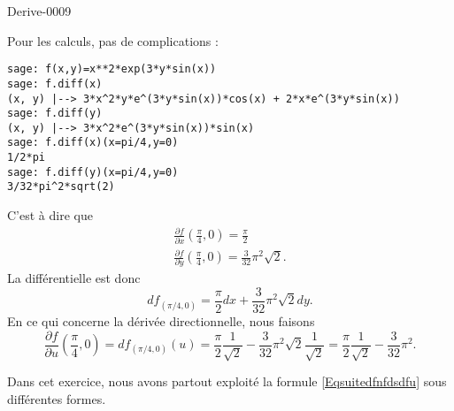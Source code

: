 
\begin{corrige}{Derive-0009}

    Pour les calculs, pas de complications :
    \begin{verbatim}
sage: f(x,y)=x**2*exp(3*y*sin(x))
sage: f.diff(x)            
(x, y) |--> 3*x^2*y*e^(3*y*sin(x))*cos(x) + 2*x*e^(3*y*sin(x))
sage: f.diff(y)
(x, y) |--> 3*x^2*e^(3*y*sin(x))*sin(x)
sage: f.diff(x)(x=pi/4,y=0)
1/2*pi
sage: f.diff(y)(x=pi/4,y=0)
3/32*pi^2*sqrt(2)
    \end{verbatim}
    C'est à dire que
    \begin{subequations}
        \begin{align}
            \frac{ \partial f }{ \partial x }(\frac{ \pi }{ 4 },0)=\frac{ \pi }{ 2 }\\
            \frac{ \partial f }{ \partial y } (\frac{ \pi }{ 4 },0)=\frac{ 3 }{ 32 }\pi^2\sqrt{2}.
        \end{align}
    \end{subequations}
    La différentielle est donc
    \begin{equation}
        df_{(\pi/4,0)}=\frac{ \pi }{ 2 }dx+\frac{ 3 }{ 32 }\pi^2\sqrt{2}dy.
    \end{equation}
    En ce qui concerne la dérivée directionnelle, nous faisons
    \begin{equation}
        \frac{ \partial f }{ \partial u }(\frac{ \pi }{ 4 },0)=df_{(\pi/4,0)}(u)=\frac{ \pi }{2}\frac{1}{ \sqrt{2} }-\frac{ 3 }{ 32 }\pi^2\sqrt{2}\frac{1}{ \sqrt{2} }=\frac{ \pi }{2}\frac{1}{ \sqrt{2} }-\frac{ 3 }{ 32 }\pi^2.
    \end{equation}

    Dans cet exercice, nous avons partout exploité la formule \eqref{Eqsuitedfnfdsdfu} sous différentes formes.
\end{corrige}
